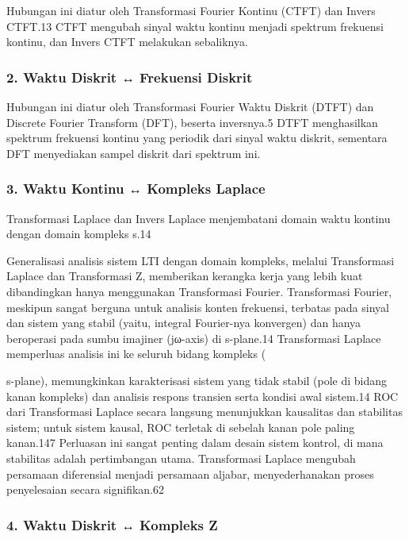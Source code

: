 \documentclass[
  letterpaper,
  DIV=11,
  numbers=noendperiod]{scrreprt}
\begin{document}
Hubungan ini diatur oleh Transformasi Fourier Kontinu (CTFT) dan Invers
CTFT.13 CTFT mengubah sinyal waktu kontinu menjadi spektrum frekuensi
kontinu, dan Invers CTFT melakukan sebaliknya.

\subsubsection{2. Waktu Diskrit ↔ Frekuensi
Diskrit}\label{waktu-diskrit-frekuensi-diskrit}

Hubungan ini diatur oleh Transformasi Fourier Waktu Diskrit (DTFT) dan
Discrete Fourier Transform (DFT), beserta inversnya.5 DTFT menghasilkan
spektrum frekuensi kontinu yang periodik dari sinyal waktu diskrit,
sementara DFT menyediakan sampel diskrit dari spektrum ini.

\subsubsection{3. Waktu Kontinu ↔ Kompleks
Laplace}\label{waktu-kontinu-kompleks-laplace}

Transformasi Laplace dan Invers Laplace menjembatani domain waktu
kontinu dengan domain kompleks s.14

Generalisasi analisis sistem LTI dengan domain kompleks, melalui
Transformasi Laplace dan Transformasi Z, memberikan kerangka kerja yang
lebih kuat dibandingkan hanya menggunakan Transformasi Fourier.
Transformasi Fourier, meskipun sangat berguna untuk analisis konten
frekuensi, terbatas pada sinyal dan sistem yang stabil (yaitu, integral
Fourier-nya konvergen) dan hanya beroperasi pada sumbu imajiner
(jω-axis) di s-plane.14 Transformasi Laplace memperluas analisis ini ke
seluruh bidang kompleks (

s-plane), memungkinkan karakterisasi sistem yang tidak stabil (pole di
bidang kanan kompleks) dan analisis respons transien serta kondisi awal
sistem.14 ROC dari Transformasi Laplace secara langsung menunjukkan
kausalitas dan stabilitas sistem; untuk sistem kausal, ROC terletak di
sebelah kanan pole paling kanan.147 Perluasan ini sangat penting dalam
desain sistem kontrol, di mana stabilitas adalah pertimbangan utama.
Transformasi Laplace mengubah persamaan diferensial menjadi persamaan
aljabar, menyederhanakan proses penyelesaian secara signifikan.62

\subsubsection{4. Waktu Diskrit ↔ Kompleks
Z}\label{waktu-diskrit-kompleks-z}
\end{document}

